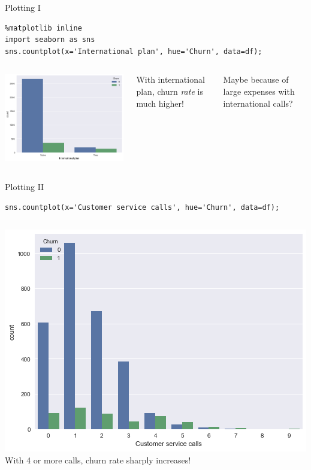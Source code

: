 \documentclass[aspectratio=169,usenames,dvipsnames]{beamer}
\begin{document}
\begin{frame}[fragile]{Plotting I}
\begin{lstlisting}
%matplotlib inline
import seaborn as sns
sns.countplot(x='International plan', hue='Churn', data=df);
\end{lstlisting}
\begin{columns}
\includegraphics[height=0.6\textheight]{fig/telecomplot}

With international plan, churn \emph{rate} is much higher!

\vspace{1em}
Maybe because of large expenses with international calls?
\end{columns}
\end{frame}


\begin{frame}[fragile]{Plotting II}
\begin{lstlisting}
sns.countplot(x='Customer service calls', hue='Churn', data=df);
\end{lstlisting}

\begin{columns}
\includegraphics[height=0.6\textheight]{fig/telecomplot2}
With 4 or more calls, churn rate sharply increases!
\end{columns}
\end{frame}
\end{document}
